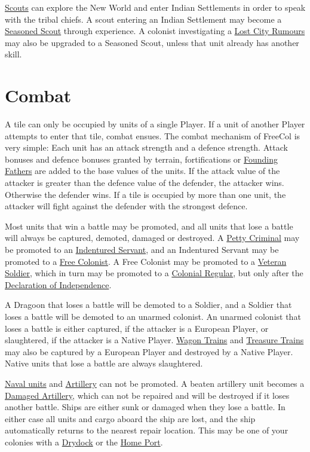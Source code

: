 \documentclass[12pt]{book}
\begin{document}
\hyperlink{Scout}{Scouts} can explore the New World and enter Indian
Settlements in order to speak with the tribal chiefs. A scout entering
an Indian Settlement may become a \hyperlink{Seasoned Scout}{Seasoned
Scout} through experience. A colonist investigating a \hyperlink{Lost
City Rumours}{Lost City Rumours} may also be upgraded to a Seasoned
Scout, unless that unit already has another skill.


\hypertarget{Combat}{\section{Combat}}

A tile can only be occupied by units of a single Player. If a unit of
another Player attempts to enter that tile, combat ensues. The combat
mechanism of FreeCol is very simple: Each unit has an attack strength
and a defence strength. Attack bonuses and defence bonuses granted by
terrain, fortifications or \hyperlink{Founding Fathers}{Founding
Fathers} are added to the base values of the units. If the attack
value of the attacker is greater than the defence value of the
defender, the attacker wins. Otherwise the defender wins. If a tile is
occupied by more than one unit, the attacker will fight against the
defender with the strongest defence.

Most units that win a battle may be \hypertarget{promotion}{promoted},
and all units that lose a battle will always be captured, demoted,
damaged or destroyed. A \hyperlink{Petty Criminal}{Petty Criminal} may
be promoted to an \hyperlink{Indentured Servant}{Indentured Servant},
and an Indentured Servant may be promoted to a \hyperlink{Free
  Colonist}{Free Colonist}. A Free Colonist may be promoted to a
\hyperlink{Veteran Soldier}{Veteran Soldier}, which in turn may be
promoted to a \hyperlink{Colonial Regular}{Colonial Regular}, but only
after the \hyperlink{Declaration of Independence}{Declaration of
  Independence}.

A Dragoon that loses a battle will be demoted to a Soldier, and a
Soldier that loses a battle will be demoted to an unarmed colonist. An
unarmed colonist that loses a battle is either captured, if the
attacker is a European Player, or slaughtered, if the attacker is a
Native Player. \hyperlink{Wagon Train}{Wagon Trains} and
\hyperlink{Treasure Train}{Treasure Trains} may also be captured by a
European Player and destroyed by a Native Player. Native units that
lose a battle are always slaughtered.

\hyperlink{Naval Units}{Naval units} and
\hyperlink{Artillery}{Artillery} can not be promoted. A beaten
artillery unit becomes a \hyperlink{Damaged Artillery}{Damaged
Artillery}, which can not be repaired and will be destroyed if it
loses another battle. Ships are either sunk or damaged when they lose
a battle. In either case all units and cargo aboard the ship are lost,
and the ship automatically returns to the nearest repair
location. This may be one of your colonies with a
\hyperlink{Drydock}{Drydock} or the \hyperlink{Home Port}{Home Port}.
\end{document}

